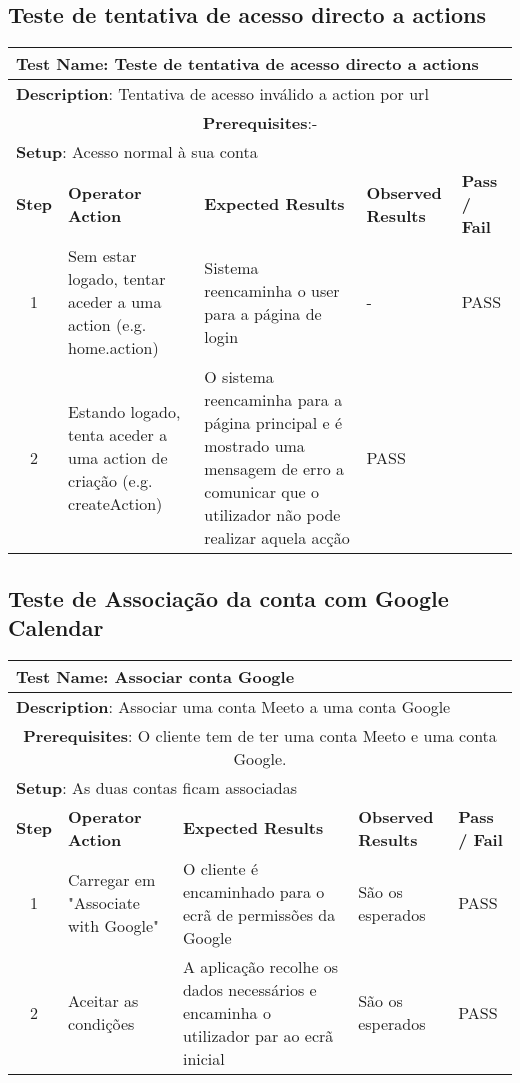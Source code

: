 \documentclass[12pt]{article} %
\begin{document}
\subsection{Teste de tentativa de acesso directo a actions}
\begin{table}[ht!]
	\begin{tabular}{|c|p{4cm}|p{4cm}|p{3cm}|p{1cm}|}
		\hline
		\multicolumn{5}{|l|}{\textbf{Test Name}: Teste de tentativa de acesso directo a actions}\\
		\hline
		\multicolumn{5}{|l|}{\textbf{Description}: Tentativa de acesso inválido a action por url}\\
		\hline
		\multicolumn{5}{|p{14,5cm}|}{\textbf{Prerequisites}:-}\\
		\hline
		\multicolumn{5}{|l|}{\textbf{Setup}: Acesso normal à sua conta}\\
		\hline
		\textbf{Step} & \textbf{Operator Action} & \textbf{Expected Results} & \textbf{Observed Results} & \textbf{Pass / Fail}\\
		\hline
		1 & Sem estar logado, tentar aceder a uma action (e.g. home.action) & Sistema reencaminha o user para a página de login & - & PASS\\
		\hline
		2 & Estando logado, tenta aceder a uma action de criação (e.g. createAction) & O sistema reencaminha para a página principal e é mostrado uma mensagem de erro a comunicar que o utilizador não pode realizar aquela acção & PASS\\
		\hline

	\end{tabular}
\end{table}



\subsection{Teste de Associação da conta com Google Calendar}
\begin{table}[ht!]
	\begin{tabular}{|c|p{4cm}|p{4cm}|p{3cm}|p{1cm}|}
		\hline
		\multicolumn{5}{|l|}{\textbf{Test Name}: Associar conta Google}\\
		\hline
		\multicolumn{5}{|l|}{\textbf{Description}: Associar uma conta Meeto a uma conta Google}\\
		\hline
		\multicolumn{5}{|p{14,5cm}|}{\textbf{Prerequisites}: O cliente tem de ter uma conta Meeto e uma conta Google.}\\
		\hline
		\multicolumn{5}{|l|}{\textbf{Setup}: As duas contas ficam associadas}\\
		\hline
		\textbf{Step} & \textbf{Operator Action} & \textbf{Expected Results} & \textbf{Observed Results} & \textbf{Pass / Fail}\\
		\hline
		1 & Carregar em "Associate with Google" & O cliente é encaminhado para o ecrã de permissões da Google & São os esperados & PASS\\
		\hline
		2 & Aceitar as condições & A aplicação recolhe os dados necessários e encaminha o utilizador par ao ecrã inicial & São os esperados & PASS\\
		\hline
	\end{tabular}
\end{table}
\end{document}

